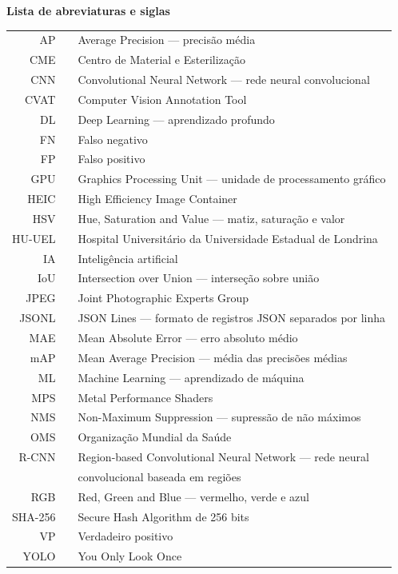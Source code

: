 \thispagestyle{empty}
\centering\textbf{Lista de abreviaturas e siglas}
\vspace{6pt}
\vspace{12pt}

\begin{tabular}{r l}
    AP~~
    &
    Average Precision — precisão média
    \\
    CME~~
    &
    Centro de Material e Esterilização
    \\
    CNN~~
    &
    Convolutional Neural Network — rede neural convolucional
    \\
    CVAT~~
    &
    Computer Vision Annotation Tool
    \\
    DL~~
    &
    Deep Learning — aprendizado profundo
    \\
    FN~~
    &
    Falso negativo
    \\
    FP~~
    &
    Falso positivo
    \\
    GPU~~
    &
    Graphics Processing Unit — unidade de processamento gráfico
    \\
    HEIC~~
    &
    High Efficiency Image Container
    \\
    HSV~~
    &
    Hue, Saturation and Value — matiz, saturação e valor
    \\
    HU-UEL~~
    &
    Hospital Universitário da Universidade Estadual de Londrina
    \\
    IA~~
    &
    Inteligência artificial
    \\
    IoU~~
    &
    Intersection over Union — interseção sobre união
    \\
    JPEG~~
    &
    Joint Photographic Experts Group
    \\
    JSONL~~
    &
    JSON Lines — formato de registros JSON separados por linha
    \\
    MAE~~
    &
    Mean Absolute Error — erro absoluto médio
    \\
    mAP~~
    &
    Mean Average Precision — média das precisões médias
    \\
    ML~~
    &
    Machine Learning — aprendizado de máquina
    \\
    MPS~~
    &
    Metal Performance Shaders
    \\
    NMS~~
    &
    Non-Maximum Suppression — supressão de não máximos
    \\
    OMS~~
    &
    Organização Mundial da Saúde
    \\
    R-CNN~~
    &
    Region-based Convolutional Neural Network — rede neural
    \\
    ~~
    &
    convolucional baseada em regiões
    \\
    RGB~~
    &
    Red, Green and Blue — vermelho, verde e azul
    \\
    SHA-256~~
    &
    Secure Hash Algorithm de 256 bits
    \\
    VP~~
    &
    Verdadeiro positivo
    \\
    YOLO~~
    &
    You Only Look Once
\end{tabular}
